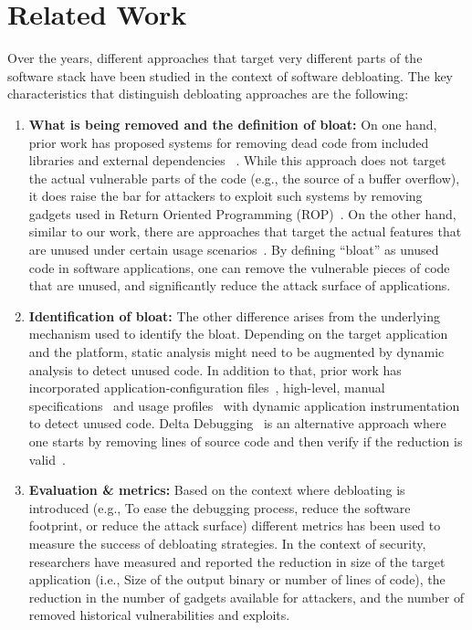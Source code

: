 
\chapter{Related Work\label{ch:pastwork}}

Over the years, different approaches that target very different parts of the
software stack have been studied in the context of software debloating. The key characteristics that distinguish debloating approaches are the following:

\begin{enumerate}
  \item{\textbf{What is being removed and the definition of bloat:} On one hand, prior work has proposed systems for removing dead code from included libraries and external dependencies ~\cite{jiang2016Jred, jiang2018reddroid, quach2018debloating}. While this approach does not
  target the actual vulnerable parts of the code (e.g., the source of a buffer overflow), it does raise the bar for attackers to exploit such systems by removing gadgets used in Return Oriented Programming (ROP)~\cite{shacham2007geometry}.
  On the other hand, similar to our work, there are approaches that target the actual features that are unused under certain usage scenarios~\cite{boomsma2012Dead, heo2018effective, regehr2012CReduce, Snyder2017, sun2018perses}. By defining ``bloat'' as unused code in software applications, one can remove the vulnerable pieces of code that are unused, and significantly reduce the attack surface of applications.}
  \item{\textbf{Identification of bloat:} The other difference arises from the underlying mechanism used to identify the bloat. Depending on the target application and the platform, static analysis might need to be augmented by dynamic analysis to detect
  unused code. In addition to that, prior work has incorporated application-configuration files~\cite{Koo:2019:CSD:3301417.3312501}, high-level, manual specifications~\cite{heo2018effective, sharif2018Trimmer} and usage profiles~\cite{boomsma2012Dead} with dynamic application instrumentation to detect unused code. Delta Debugging~\cite{zeller2002Delta} is an alternative approach where one starts by removing lines of source code and then verify if the reduction is valid~\cite{heo2018effective, regehr2012CReduce, sun2018perses}.}
  \item{\textbf{Evaluation \& metrics:} Based on the context where debloating is introduced (e.g., To ease the debugging process, reduce the software footprint, or reduce the attack surface) different metrics has been used to measure the success of debloating strategies. In the context of security, researchers have measured and reported the reduction in size of the target application (i.e., Size of the output binary or number of lines of code), the reduction in the number of gadgets available for attackers, and the number of removed historical vulnerabilities and exploits.}
\end{enumerate}



